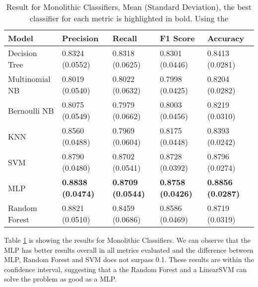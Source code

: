 \begin{table}[h!]
    \centering
    \renewcommand{\arraystretch}{1.8}
    \begin{tabular}{ p{3cm}p{2.8cm}p{2.8cm}p{2.8cm}p{2.8cm} }
        \toprule
        Model & Precision & Recall & F1 Score & Accuracy \\
        \midrule
        Decision Tree &     0.8324 (0.0552) & 0.8318 (0.0625) & 0.8301 (0.0446) & 0.8413 (0.0281) \\
        Multinomial NB &    0.8019 (0.0540) & 0.8022 (0.0632) & 0.7998 (0.0425) & 0.8204 (0.0282) \\
        Bernoulli NB &      0.8075 (0.0549) & 0.7979 (0.0662) & 0.8003 (0.0456) & 0.8219 (0.0310) \\
        KNN &               0.8560 (0.0488) & 0.7969 (0.0604) & 0.8175 (0.0448) & 0.8393 (0.0242) \\
        SVM &               0.8790 (0.0480) & 0.8702 (0.0541) & 0.8728 (0.0392) & 0.8796 (0.0274) \\
        MLP &               \textbf{0.8838 (0.0474)} & \textbf{0.8709 (0.0544)} & \textbf{0.8758 (0.0426)} & \textbf{0.8856 (0.0287)} \\
        Random Forest &     0.8821 (0.0510) & 0.8459 (0.0686) & 0.8586 (0.0469) & 0.8719 (0.0319) \\ [1ex]
        \bottomrule
        \end{tabular}
        \caption{%
        Result for Monolithic Classifiers, Mean (Standard Deviation), the best classifier for each metric is highlighted in bold. Using the %
        }\label{table:result_monolithic}
        \vspace{4ex}
\end{table}

Table \ref{table:result_monolithic} is showing the results for Monolithic Classifiers. We can observe that the MLP has better results overall in all metrics evaluated and the difference between MLP, Random Forest and SVM does not surpass 0.1. These results are within the confidence interval, suggesting that a the Random Forest and a LinearSVM can solve the problem as good as a MLP.
